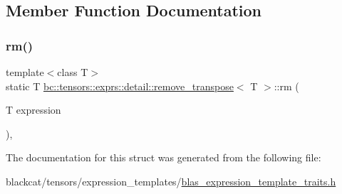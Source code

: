 \subsection{Member Function Documentation}
\mbox{\label{structbc_1_1tensors_1_1exprs_1_1detail_1_1remove__transpose_ad9cc5239838d4afc5b5c8f889865de58}} 
\subsubsection{\texorpdfstring{rm()}{rm()}}
{\footnotesize\ttfamily template$<$class T$>$ \\
static T \hyperlink{structbc_1_1tensors_1_1exprs_1_1detail_1_1remove__transpose}{bc\+::tensors\+::exprs\+::detail\+::remove\+\_\+transpose}$<$ T $>$\+::rm (\begin{DoxyParamCaption}\item[{T}]{expression }\end{DoxyParamCaption})\hspace{0.3cm}{\ttfamily [inline]}, {\ttfamily [static]}}



The documentation for this struct was generated from the following file\+:\begin{DoxyCompactItemize}
\item 
blackcat/tensors/expression\+\_\+templates/\hyperlink{blas__expression__template__traits_8h}{blas\+\_\+expression\+\_\+template\+\_\+traits.\+h}\end{DoxyCompactItemize}
